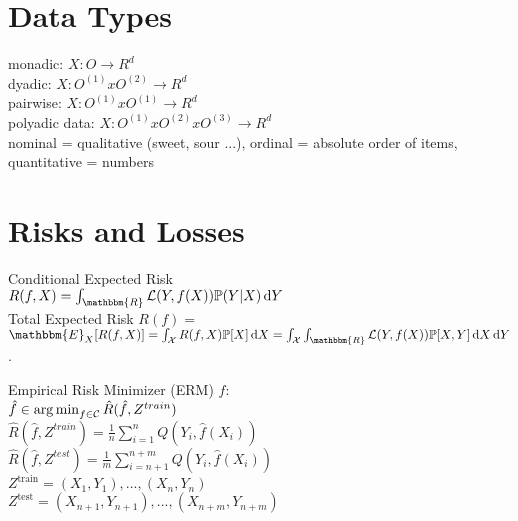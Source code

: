 \section*{Data Types}
monadic: $X: O \rightarrow R^d$ \\
dyadic: $X: O^{(1)} x O^{(2)} \rightarrow R^d $ \\
pairwise: $X: O^{(1)} x O^{(1)} \rightarrow R^d$ \\
polyadic data: $X: O^{(1)} x O^{(2)} x O^{(3)} \rightarrow R^d $ \\
nominal = qualitative (sweet, sour ...), ordinal = absolute order of items, quantitative = numbers
\section*{Risks and Losses}
Conditional Expected Risk\\
$R(f, X) = \int_{\mathbbm{R}} \mathcal{L}(Y,f(X))\mathbb{P}(Y|X)\di Y$\\
Total Expected Risk
$R(f) =$\\
$\mathbbm{E}_{X}[R(f,X)] =\int_{\mathcal{X}}R(f,X)\mathbb{P}[X]\di X =
\int_{\mathcal{X}}\int_{\mathbbm{R}} \mathcal{L}(Y,f(X))\mathbb{P}[X,Y]\di X\di Y$.


Empirical Risk Minimizer (ERM) $\hat{f}$:\\
$\hat{f} \in \operatorname*{arg\,min}_{f \in \mathcal{C}} \hat{R}(\hat{f}, Z^{train})$\\
$\hat{R}(\hat{f}, Z^{train}) = \frac{1}{n} \sum_{i=1}^n Q(Y_i, \hat{f}(X_i))$\\
$\hat{R}(\hat{f}, Z^{test}) = \frac{1}{m} \sum_{i=n+1}^{n+m} Q(Y_i, \hat{f}(X_i))$\\
$Z^\text{train}={(X_1,Y_1),...,(X_n,Y_n)}$ \\
$Z^\text{test}={(X_{n+1},Y_{n+1}),...,(X_{n+m},Y_{n+m})}$

